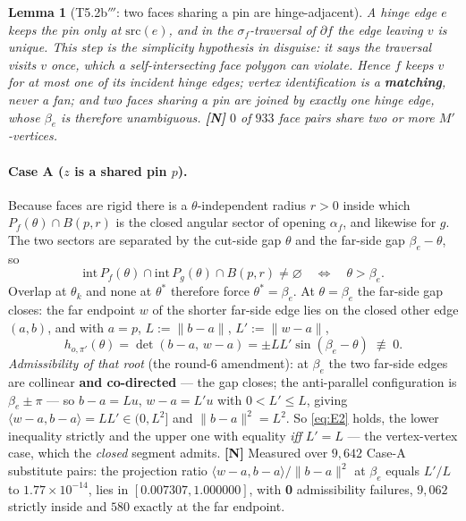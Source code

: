 \documentclass[11pt,a4paper]{article}
\newtheorem{lemma}[theorem]{Lemma}
\theoremstyle{definition}
\newcommand{\Mprime}{M'}
\begin{document}
\begin{lemma}[T5.2b$'''$: two faces sharing a pin are hinge-adjacent]
A hinge edge $e$ keeps the pin only at $\mathrm{src}(e)$, and in the $\sigma_f$-traversal of
$\partial f$ the edge leaving $v$ is unique. \emph{This step is the simplicity hypothesis in
disguise: it says the traversal visits $v$ once, which a self-intersecting face polygon can
violate.} Hence $f$ keeps $v$ for at most one of its incident hinge edges; vertex
identification is a \textbf{matching}, never a fan; and two faces sharing a pin are joined by
exactly one hinge edge, whose $\beta_e$ is therefore unambiguous. \textbf{[N]} $0$ of $933$
face pairs share two or more $\Mprime$-vertices.
\end{lemma}

\paragraph{Case A ($z$ is a shared pin $p$).} Because faces are rigid there is a
$\theta$-independent radius $r>0$ inside which $P_f(\theta)\cap B(p,r)$ is the closed angular
sector of opening $\alpha_f$, and likewise for $g$. The two sectors are separated by the
cut-side gap $\theta$ and the far-side gap $\beta_e-\theta$, so
\begin{equation}
\mathrm{int}\,P_f(\theta)\cap\mathrm{int}\,P_g(\theta)\cap B(p,r)\ne\varnothing
\quad\Longleftrightarrow\quad \theta>\beta_e .
\label{eq:sector}
\end{equation}
Overlap at $\theta_k$ and none at $\theta^*$ therefore force $\theta^*=\beta_e$. At
$\theta=\beta_e$ the far-side gap closes: the far endpoint $w$ of the shorter far-side edge
lies on the closed other edge $(a,b)$, and with $a=p$, $L:=\|b-a\|$, $L':=\|w-a\|$,
\begin{equation}
h_{o,\pi'}(\theta)=\det(b-a,\,w-a)=\pm LL'\sin(\beta_e-\theta) \;\not\equiv\;0 .
\label{eq:caseA}
\end{equation}
\emph{Admissibility of that root} (the round-6 amendment): at $\beta_e$ the two far-side edges
are collinear \textbf{and co-directed} --- the gap closes; the anti-parallel configuration is
$\beta_e\pm\pi$ --- so $b-a=Lu$, $w-a=L'u$ with $0<L'\le L$, giving
$\langle w-a,b-a\rangle = LL' \in (0,L^2]$ and $\|b-a\|^2=L^2$. So \eqref{eq:E2} holds, the
lower inequality strictly and the upper one with equality \emph{iff} $L'=L$ --- the
vertex-vertex case, which the \emph{closed} segment admits. \textbf{[N]} Measured over
$9{,}642$ Case-A substitute pairs: the projection ratio $\langle w-a,b-a\rangle/\|b-a\|^2$ at
$\beta_e$ equals $L'/L$ to $1.77\times10^{-14}$, lies in $[0.007307, 1.000000]$, with
\textbf{0} admissibility failures, $9{,}062$ strictly inside and $580$ exactly at the far
endpoint.
\end{document}
